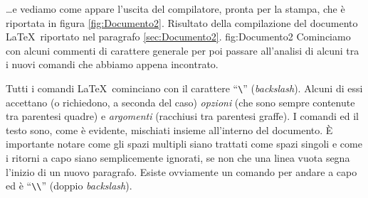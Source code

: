 \noindent \ldots e vediamo come appare l'uscita del compilatore, pronta per
la stampa, che \`e riportata in figura \ref{fig:Documento2}.
\panelfig
{}
{Risultato della compilazione del documento \LaTeX\ riportato nel
paragrafo \ref{sec:Documento2}.}
{fig:Documento2}
Cominciamo con alcuni commenti di carattere generale per poi passare
all'analisi di alcuni tra i nuovi comandi che abbiamo appena incontrato.

Tutti i comandi \LaTeX\ cominciano con il carattere ``\verb|\|''
(\emph{backslash}). Alcuni di essi accettano (o richiedono, a seconda del
caso) \emph{opzioni} (che sono sempre contenute tra parentesi quadre) e
\emph{argomenti} (racchiusi tra parentesi graffe).
I comandi ed il testo sono, come \`e evidente, mischiati insieme all'interno
del documento. \`E importante notare come gli spazi multipli siano trattati
come  spazi singoli e come i ritorni a capo siano semplicemente ignorati,
se non che una linea vuota segna l'inizio di un nuovo paragrafo.
Esiste ovviamente un comando per andare a capo ed \`e ``\verb|\\|''
(doppio \emph{backslash}).

